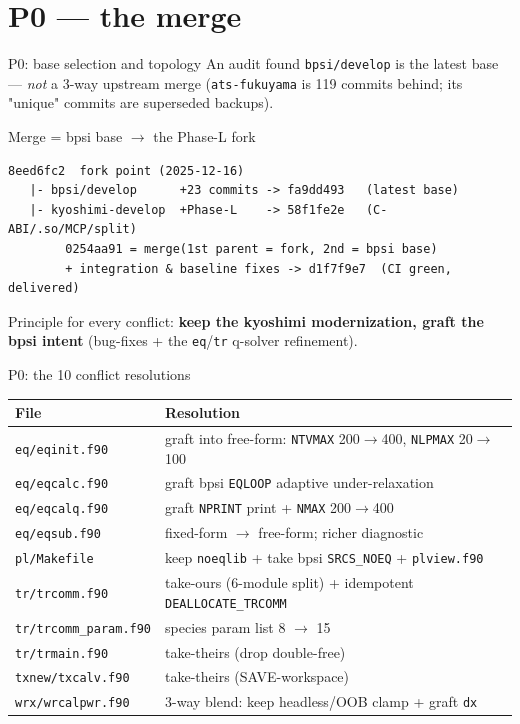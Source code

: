\documentclass[10pt,aspectratio=169]{beamer}
\newcommand{\C}[1]{\texttt{\small #1}}          %
\begin{document}
\section{P0 --- the merge}
\begin{frame}[fragile]{P0: base selection and topology}
An audit found \C{bpsi/develop} is the latest base --- \emph{not} a 3-way upstream merge
(\C{ats-fukuyama} is 119 commits behind; its "unique" commits are superseded backups).

\begin{block}{Merge = bpsi base $\rightarrow$ the Phase-L fork}
\footnotesize
\begin{verbatim}
8eed6fc2  fork point (2025-12-16)
   |- bpsi/develop      +23 commits -> fa9dd493   (latest base)
   |- kyoshimi-develop  +Phase-L    -> 58f1fe2e   (C-ABI/.so/MCP/split)
        0254aa91 = merge(1st parent = fork, 2nd = bpsi base)
        + integration & baseline fixes -> d1f7f9e7  (CI green, delivered)
\end{verbatim}
\end{block}
Principle for every conflict: \textbf{keep the kyoshimi modernization, graft the bpsi intent}
(bug-fixes + the \C{eq}/\C{tr} q-solver refinement).
\end{frame}

\begin{frame}{P0: the 10 conflict resolutions}
\begin{table}\scriptsize
\begin{tabular}{@{}ll@{}}
\toprule
File & Resolution \\
\midrule
\C{eq/eqinit.f90} & graft into free-form: \C{NTVMAX} 200$\to$400, \C{NLPMAX} 20$\to$100 \\
\C{eq/eqcalc.f90} & graft bpsi \C{EQLOOP} adaptive under-relaxation \\
\C{eq/eqcalq.f90} & graft \C{NPRINT} print + \C{NMAX} 200$\to$400 \\
\C{eq/eqsub.f90}  & fixed-form $\to$ free-form; richer diagnostic \\
\C{pl/Makefile}   & keep \C{noeqlib} + take bpsi \C{SRCS\_NOEQ} + \C{plview.f90} \\
\C{tr/trcomm.f90} & take-ours (6-module split) + idempotent \C{DEALLOCATE\_TRCOMM} \\
\C{tr/trcomm\_param.f90} & species param list 8 $\to$ 15 \\
\C{tr/trmain.f90} & take-theirs (drop double-free) \\
\C{txnew/txcalv.f90} & take-theirs (SAVE-workspace) \\
\C{wrx/wrcalpwr.f90} & 3-way blend: keep headless/OOB clamp + graft \C{dx} \\
\bottomrule
\end{tabular}
\end{table}
\end{frame}
\end{document}
